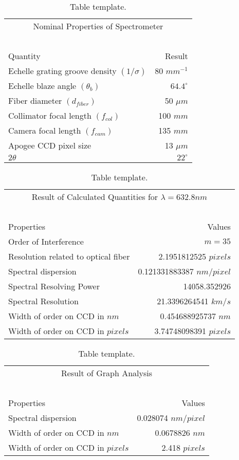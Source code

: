 \documentclass{article}
\begin{document}
\begin{table}[H]
\center
\begin{tabular}{l r}
\multicolumn{2}{c}{Nominal Properties of Spectrometer}\\
~&~\\
Quantity  &   Result \\ 
\hline
Echelle grating groove density $(1/\sigma)$ & 80 $mm^{-1}$ \\ 
\hline
Echelle blaze angle $(\theta_{b})$ & $64.4^{\circ}$  \\ 
\hline
Fiber diameter $(d_{fiber})$ & 50 $\mu m$ \\ 
\hline
Collimator focal length $(f_{col})$ & 100 $mm$ \\ 
\hline
Camera focal length $(f_{cam})$ & 135 $mm$  \\ 
\hline
Apogee CCD pixel size & 13 $\mu m$  \\ 
\hline
$2\theta$ &  $22^{\circ}$  \\ 
\hline
\end{tabular}
\caption{Table template.} 
\label{tab:1}
\end{table}

\begin{table}[H]
\center
\begin{tabular}{l r}
\multicolumn{2}{c}{Result of Calculated Quantities for $\lambda = 632.8 nm$}\\
~&~\\
Properties   &   Values \\ 
\hline
Order of Interference & $m = 35$\\ 
\hline
Resolution related to optical fiber & 2.1951812525 $pixels$\\ 
\hline
Spectral dispersion & 0.121331883387 $nm/pixel$\\ 
\hline
Spectral Resolving Power & 14058.352926\\ 
\hline
Spectral Resolution & 21.3396264541 $km/s$\\ 
\hline
Width of order on CCD in $nm$ & 0.454688925737 $nm$  \\ 
\hline
Width of order on CCD in $pixels$ &  3.74748098391 $pixels$ \\ 
\hline
\end{tabular}
\caption{Table template.} 
\label{tab:2}
\end{table}


\begin{table}[H]
\center
\begin{tabular}{l r}
\multicolumn{2}{c}{Result of Graph Analysis}\\
~&~\\
Properties   &   Values \\ 
\hline
Spectral dispersion & 0.028074 $nm/pixel$\\ 
\hline
Width of order on CCD in $nm$ & 0.0678826 $nm$  \\ 
\hline
Width of order on CCD in $pixels$ &  2.418 $pixels$ \\ 
\hline
\end{tabular}
\caption{Table template.} 
\label{tab:3}
\end{table}
\end{document}
